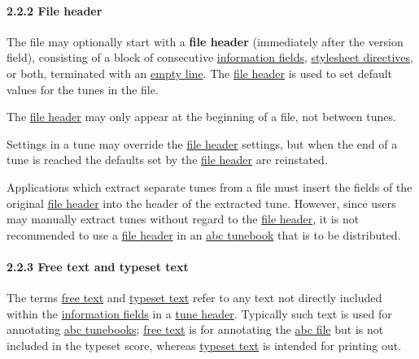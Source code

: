 \hypertarget{file_header}{\paragraph{2.2.2 File
header}\label{file_header}}

\href{}{}The file may optionally start with a \textbf{file header}
(immediately after the version field), consisting of a block of
consecutive \protect\hyperlink{information_field_definition}{information
fields}, \protect\hyperlink{stylesheet_directive_definition}{stylesheet
directives}, or both, terminated with an
\protect\hyperlink{empty_line_definition}{empty line}. The
\protect\hyperlink{file_header_definition}{file header} is used to set
default values for the tunes in the file.

The \protect\hyperlink{file_header_definition}{file header} may only
appear at the beginning of a file, not between tunes.

Settings in a tune may override the
\protect\hyperlink{file_header_definition}{file header} settings, but
when the end of a tune is reached the defaults set by the
\protect\hyperlink{file_header_definition}{file header} are reinstated.

Applications which extract separate tunes from a file must insert the
fields of the original \protect\hyperlink{file_header_definition}{file
header} into the header of the extracted tune. However, since users may
manually extract tunes without regard to the
\protect\hyperlink{file_header_definition}{file header}, it is not
recommended to use a \protect\hyperlink{file_header_definition}{file
header} in an \protect\hyperlink{abc_tunebook_definition}{abc tunebook}
that is to be distributed.

\hypertarget{free_text_and_typeset_text}{\paragraph{2.2.3 Free text and
typeset text}\label{free_text_and_typeset_text}}

The terms \protect\hyperlink{free_text_definition}{free text} and
\protect\hyperlink{typeset_text_definition}{typeset text} refer to any
text not directly included within the
\protect\hyperlink{information_field_definition}{information fields} in
a \protect\hyperlink{tune_header_definition}{tune header}. Typically
such text is used for annotating
\protect\hyperlink{abc_tunebook_definition}{abc tunebooks};
\protect\hyperlink{free_text_definition}{free text} is for annotating
the \protect\hyperlink{abc_file_definition}{abc file} but is not
included in the typeset score, whereas
\protect\hyperlink{typeset_text_definition}{typeset text} is intended
for printing out.

